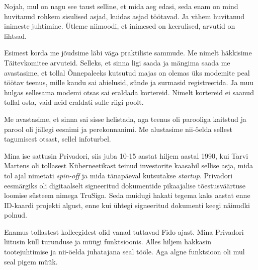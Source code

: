 
Nojah, mul on nagu see taust selline, et mida aeg edasi, seda enam on mind huvitanud rohkem sisulised asjad, kuidas asjad töötavad. Ja vähem huvitanud inimeste juhtimine. Ütleme niimoodi, et inimesed on keerulised, arvutid on lihtsad.


Esimest korda me jõudsime läbi väga praktiliste sammude. Me nimelt häkkisime Täitevkomitee arvuteid. Selleks, et sinna ligi saada ja mängima saada me avastasime, et tollal Õnnepaleeks kutsutud majas on olemas üks modemite peal töötav teenus, mille 
 kaudu sai abielusid, sünde ja surmasid registreerida. Ja muu hulgas sellesama modemi otsas sai eraldada kortereid. Nimelt kortereid ei saanud tollal osta, vaid neid eraldati sulle riigi poolt. 


Me avastasime, et sinna sai sisse helistada, aga teenus oli parooliga kaitstud ja parool oli jällegi eesnimi ja perekonnanimi. Me alustasime nii-öelda sellest tagumisest otsast, sellel infoturbel.

Mina ise sattusin Privadori, siis juba  10-15 aastat hiljem aastal 1990, kui Tarvi Martens oli tollasest Küberneetikast teinud investorite kaasabil sellise asja, mida tol ajal nimetati \emph{spin-off} ja mida tänapäeval kutsutakse \emph{startup}. Privadori  eesmärgiks oli  digitaalselt signeeritud dokumentide pikaajalise tõestusväärtuse loomise süsteem nimega TruSign. Seda muidugi hakati tegema kaks aastat enne ID-kaardi projekti algust, enne kui ühtegi signeeritud dokumenti keegi näinudki polnud.

                 
Enamus tollastest kolleegidest olid vanad tuttavad Fido ajast. Mina Privadori liitusin  küll turunduse ja müügi funktsioonis. Alles hiljem hakkasin tootejuhtimise ja nii-öelda juhatajana seal tööle. Aga algne funktsioon oli mul seal pigem müük. 


